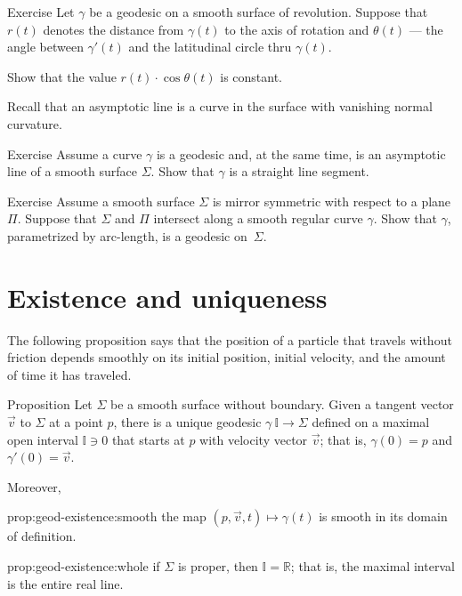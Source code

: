 \begin{thm}{Exercise}\label{ex:clairaut}
Let $\gamma$ be a geodesic on a smooth surface of revolution.
Suppose that $r(t)$ denotes the distance from $\gamma(t)$ to the axis of rotation
and $\theta(t)$ --- the angle between $\gamma'(t)$ and the latitudinal circle thru $\gamma(t)$. 

Show that the value $r(t)\cdot \cos\theta(t)$ is constant. 
\end{thm}


Recall that an asymptotic line is a curve in the surface with vanishing normal curvature.

\begin{thm}{Exercise}\label{ex:asymptotic-geodesic}
Assume a curve $\gamma$ is a geodesic and, at the same time, is an asymptotic line of a smooth surface $\Sigma$.
Show that $\gamma$ is a straight line segment.
\end{thm}


\begin{thm}{Exercise}\label{ex:reflection-geodesic}
Assume a smooth surface $\Sigma$ is mirror symmetric with respect to a plane $\Pi$.
Suppose that $\Sigma$ and $\Pi$ intersect along a smooth regular curve $\gamma$.
Show that $\gamma$, parametrized by arc-length, is a geodesic on~$\Sigma$.
\end{thm}



\section{Existence and uniqueness}

The following proposition says that the position of a particle that travels without friction depends smoothly on its initial position, initial velocity, and the amount of time it has traveled. 



\begin{thm}{Proposition}\label{prop:geod-existence} 
Let $\Sigma$ be a smooth surface without boundary.
Given a tangent vector ${\vec v}$ to $\Sigma$ at a point $p$,
there is a unique geodesic $\gamma\:\mathbb{I}\to \Sigma$ defined on a maximal open interval $\mathbb{I}\ni 0$ that starts at $p$ with velocity vector ${\vec v}$;
that is, $\gamma(0)=p$ and $\gamma'(0)={\vec v}$.

Moreover,
\begin{subthm}{prop:geod-existence:smooth} the map $(p,{\vec v},t)\mapsto \gamma(t)$ is smooth in its domain of definition.
\end{subthm}

\begin{subthm}{prop:geod-existence:whole} if $\Sigma$ is proper, then $\mathbb{I}=\mathbb{R}$; that is, the maximal interval is the entire real line.
\end{subthm}

\end{thm}

